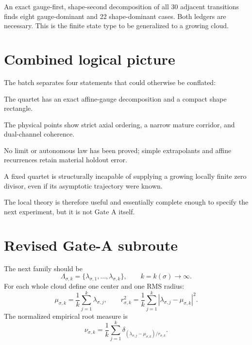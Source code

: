 \documentclass[12pt]{article}
\theoremstyle{remark}\newtheorem{remark}[theorem]{Remark}
\begin{document}
An exact gauge-first, shape-second decomposition of all 30 adjacent
transitions finds eight gauge-dominant and 22 shape-dominant cases.  Both
ledgers are necessary.  This is the finite state type to be generalized to a
growing cloud.

\section{Combined logical picture}

The batch separates four statements that could otherwise be conflated:
\begin{description}[leftmargin=3.4em,style=nextline]
\item[Finite quotient]
The quartet has an exact affine-gauge decomposition and a compact shape
rectangle.
\item[Finite trajectory]
The physical points show strict axial ordering, a narrow mature corridor,
and dual-channel coherence.
\item[Asymptotic trajectory]
No limit or autonomous law has been proved; simple extrapolants and affine
recurrences retain material holdout error.
\item[Infinite determinant]
A fixed quartet is structurally incapable of supplying a growing locally
finite zero divisor, even if its asymptotic trajectory were known.
\end{description}

The local theory is therefore useful and essentially complete enough to
specify the next experiment, but it is not Gate A itself.

\section{Revised Gate-A subroute}

The next family should be
\begin{equation}\label{eq:growingcloud}
 \Lambda_{\sigma,k}
 =\{\lambda_{\sigma,1},\ldots,\lambda_{\sigma,k}\},
 \qquad k=k(\sigma)\longrightarrow\infty.
\end{equation}
For each whole cloud define one center and one RMS radius:
\begin{equation}
 \mu_{\sigma,k}=\frac1k\sum_{j=1}^{k}\lambda_{\sigma,j},
 \qquad
 r_{\sigma,k}^2=\frac1k\sum_{j=1}^{k}
 |\lambda_{\sigma,j}-\mu_{\sigma,k}|^2.
\end{equation}
The normalized empirical root measure is
\begin{equation}\label{eq:measure}
 \nu_{\sigma,k}=\frac1k\sum_{j=1}^{k}
 \delta_{(\lambda_{\sigma,j}-\mu_{\sigma,k})/r_{\sigma,k}}.
\end{equation}
\end{document}
